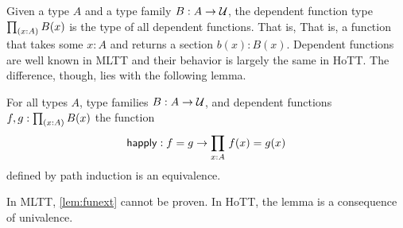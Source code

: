 \documentclass[main.tex]{subfiles}
\begin{document}
Given a type $A$ and a type family $B : A \to \mathcal{U}$, the dependent function type $\prd{x:A}B(x)$ is the type of all dependent functions. That is,
That is, a function that takes some $x : A$ and returns a section $b(x) : B(x)$. Dependent functions are well known in MLTT and their behavior is largely
the same in HoTT. The difference, though, lies with the following lemma.

\begin{lemma}
    \label{lem:funext}
    For all types $A$, type families $B : A \to \mathcal{U}$, and dependent functions $f,g : \prd{x:A}B(x)$ the function
    $$\happly : f=g \to \prd{x:A}f(x)=g(x)$$
    defined by path induction is an equivalence.
\end{lemma}

In MLTT, \ref{lem:funext} cannot be proven. In HoTT, the lemma is a consequence of univalence. 
    
\end{document}
